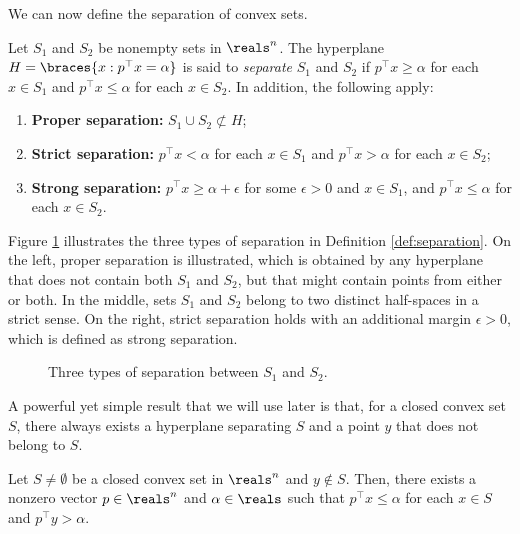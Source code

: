 We can now define the separation of convex sets. 
%
\begin{definition} \label{def:separation}
	Let $S_1$ and $S_2$ be nonempty sets in $\reals^n$. The hyperplane $H = \braces{x: p^\top x = \alpha}$ is said to \emph{separate} $S_1$ and $S_2$ if $ p^\top x \geq \alpha$ for each $x \in S_1$ and $p^\top x \leq \alpha$ for each $x \in S_2$. In addition, the following apply: 
	\begin{enumerate}
		\item {\bf Proper separation:} $S_1 \cup S_2 \not\subset H$;
		\item {\bf Strict separation:} $ p^\top x < \alpha$ for each $x \in S_1$ and $p^\top x > \alpha$ for each $x \in S_2$;
		\item {\bf Strong separation:} $ p^\top x \geq \alpha + \epsilon$ for some $\epsilon >0$ and $x \in S_1$, and $p^\top x \leq \alpha$ for each $x \in S_2$.
	\end{enumerate}
\end{definition}
%
Figure \ref{fig:separation} illustrates the three types of separation in Definition \ref{def:separation}. On the left, proper separation is illustrated, which is obtained by any hyperplane that does not contain both $S_1$ and $S_2$, but that might contain points from either or both. In the middle, sets $S_1$ and $S_2$ belong to two distinct half-spaces in a strict sense. On the right, strict separation holds with an additional margin $\epsilon > 0$, which is defined as strong separation. 
%
\begin{figure}[H]
	\caption{Three types of separation between $S_1$ and $S_2$.} \label{fig:separation}
\end{figure}
%
A powerful yet simple result that we will use later is that, for a closed convex set $S$, there always exists a hyperplane separating $S$ and a point $y$ that does not belong to $S$.
\begin{theorem}\label{p2c2:thm:separation}
Let $S \neq \emptyset$ be a closed convex set in $\reals^n$ and $y \notin S$. Then, there exists a nonzero vector $p \in \reals^n$ and $\alpha \in \reals$ such that $p^\top x \leq \alpha$ for each $x \in S$ and $p^\top y > \alpha$.
\end{theorem}
